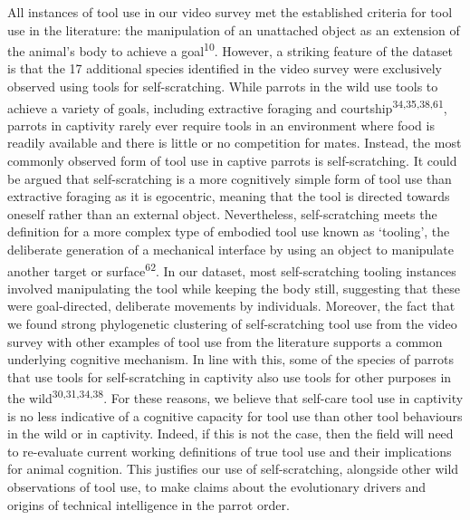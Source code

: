 \documentclass[
  man, donotrepeattitle,floatsintext]{apa6}
\begin{document}
All instances of tool use in our video survey met the established criteria for
tool use in the literature: the manipulation of an unattached object as an
extension of the animal's body to achieve a goal\textsuperscript{10}. However, a
striking feature of the dataset is that the 17 additional species identified in
the video survey were exclusively observed using tools for self-scratching.
While parrots in the wild use tools to achieve a variety of goals, including
extractive foraging and courtship\textsuperscript{34,35,38,61}, parrots in captivity rarely ever require tools in an environment
where food is readily available and there is little or no competition for mates.
Instead, the most commonly observed form of tool use in captive parrots is
self-scratching. It could be argued that self-scratching is a more cognitively
simple form of tool use than extractive foraging as it is egocentric, meaning
that the tool is directed towards oneself rather than an external object.
Nevertheless, self-scratching meets the definition for a more complex type of
embodied tool use known as `tooling', the deliberate generation of a mechanical
interface by using an object to manipulate another target or surface\textsuperscript{62}. In our dataset, most self-scratching tooling instances involved
manipulating the tool while keeping the body still, suggesting that these were
goal-directed, deliberate movements by individuals. Moreover, the fact that we
found strong phylogenetic clustering of self-scratching tool use from the video
survey with other examples of tool use from the literature supports a common
underlying cognitive mechanism. In line with this, some of the species of
parrots that use tools for self-scratching in captivity also use tools for other
purposes in the wild\textsuperscript{30,31,34,38}. For
these reasons, we believe that self-care tool use in captivity is no less
indicative of a cognitive capacity for tool use than other tool behaviours in
the wild or in captivity. Indeed, if this is not the case, then the field will
need to re-evaluate current working definitions of true tool use and their
implications for animal cognition. This justifies our use of self-scratching,
alongside other wild observations of tool use, to make claims about the
evolutionary drivers and origins of technical intelligence in the parrot order.
\end{document}
